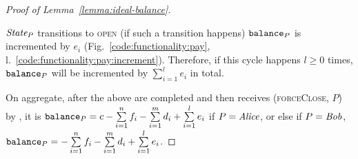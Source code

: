 \begin{proof}[Proof of Lemma~\ref{lemma:ideal-balance}]
\begin{itemize}
    $\itistate_P$ transitions to \textsc{open} (if such a transition happens)
    $\texttt{balance}_{P}$ is incremented by $e_i$
    (Fig.~\ref{code:functionality:pay},
    l.~\ref{code:functionality:pay:increment}). Therefore, if this cycle
    happens $l \geq 0$ times, $\texttt{balance}_{P}$ will be incremented by
    $\sum\limits_{i=1}^l e_i$ in total.
  \end{itemize}
  On aggregate, after the above are completed and then \fchan receives
  (\textsc{forceClose}, $P$) by \simulator, it is $\texttt{balance}_{P} = c -
  \sum\limits_{i=1}^n f_i - \sum\limits_{i=1}^m d_i + \sum\limits_{i=1}^l e_i$
  if $P = \mathit{Alice}$, or else if $P = \mathit{Bob}$, $\texttt{balance}_{P} = - \sum\limits_{i=1}^n
  f_i - \sum\limits_{i=1}^m d_i + \sum\limits_{i=1}^l e_i$.
\end{proof}
